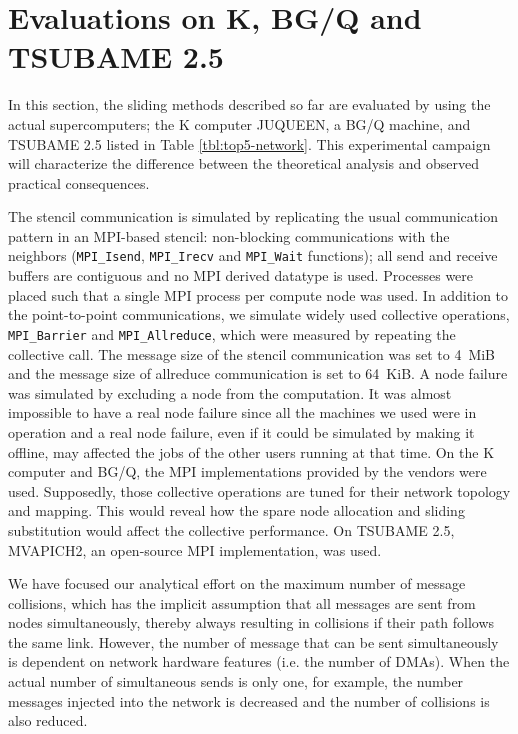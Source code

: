 \documentclass[Afour,times,sageh]{sagej}
\begin{document}
\section{Evaluations on K, BG/Q and TSUBAME 2.5}
\label{sec:eval}

In this section, the sliding methods described so far are evaluated by
using the actual supercomputers; the K computer
JUQUEEN\citep{JUQUEEN}, a BG/Q machine, and TSUBAME 2.5
listed in Table \ref{tbl:top5-network}.
This experimental campaign will characterize the difference
between the theoretical analysis and observed practical consequences.

The stencil communication is simulated by replicating the usual
communication pattern in an MPI-based stencil: non-blocking communications with
the neighbors ({\tt MPI\_Isend}, {\tt MPI\_Irecv} and {\tt MPI\_Wait}
functions); all send and receive buffers are contiguous and no MPI derived
datatype is used.
%
Processes were placed such that a single MPI process per compute node was used.
In addition to the point-to-point communications, we simulate widely used
collective operations, {\tt MPI\_Barrier} and {\tt MPI\_Allreduce}, which were
measured by repeating the collective call. The message size of the stencil
communication was set to 4~MiB and the message size of allreduce communication
is set to 64~KiB.
%
A node failure was simulated by excluding a node from the
computation. It was almost impossible to have a real node failure since
all the machines we used were in operation and a real node failure,
even if it could be simulated by making it offline, may affected
the jobs of the other users running at that time.
%
On the K computer and BG/Q, the MPI implementations provided by the vendors were
used. Supposedly, those collective operations are tuned for their network
topology and mapping.  This would reveal how the spare node allocation and
sliding substitution would affect the collective performance. On TSUBAME 2.5,
MVAPICH2, an open-source MPI implementation, was used.

We have focused our analytical effort on the
maximum number of message collisions, which has the implicit
assumption that all messages are sent from nodes simultaneously,
thereby always resulting in collisions if their path follows the same
link. However, the number of message that can be sent simultaneously
is dependent on network hardware features (i.e. the number of
DMAs). When the actual number of simultaneous sends is only one, for
example, the number messages injected into the network is decreased
and the number of collisions is also reduced.
\end{document}
